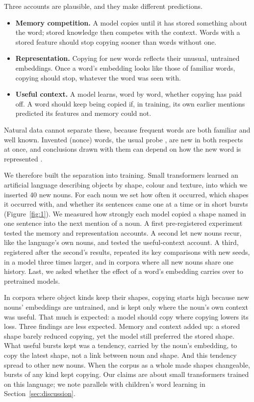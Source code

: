 \documentclass[11pt]{article}
\begin{document}
Three accounts are plausible, and they make different predictions.
\begin{itemize}[leftmargin=*,itemsep=1pt,topsep=2pt]
\item \textbf{Memory competition.} A model copies until it has stored something about the word; stored knowledge then competes with the context. Words with a stored feature should stop copying sooner than words without one.
\item \textbf{Representation.} Copying for new words reflects their unusual, untrained embeddings. Once a word's embedding looks like those of familiar words, copying should stop, whatever the word was seen with.
\item \textbf{Useful context.} A model learns, word by word, whether copying has paid off. A word should keep being copied if, in training, its own earlier mentions predicted its features and memory could not.
\end{itemize}
Natural data cannot separate these, because frequent words are both familiar and well known. Invented (nonce) words, the usual probe \citep{thrush2020,misra2023}, are new in both respects at once, and conclusions drawn with them can depend on how the new word is represented \citep{kim2022lexical,cacioli2026me}.

We therefore built the separation into training. Small transformers learned an artificial language describing objects by shape, colour and texture, into which we inserted 40 new nouns. For each noun we set how often it occurred, which shapes it occurred with, and whether its sentences came one at a time or in short bursts (Figure~\ref{fig:1}). We measured how strongly each model copied a shape named in one sentence into the next mention of a noun. A first pre-registered experiment tested the memory and representation accounts. A second let new nouns recur, like the language's own nouns, and tested the useful-context account. A third, registered after the second's results, repeated its key comparisons with new seeds, in a model three times larger, and in corpora where all new nouns share one history. Last, we asked whether the effect of a word's embedding carries over to pretrained models.

In corpora where object kinds keep their shapes, copying starts high because new nouns' embeddings are untrained, and is kept only where the noun's own context was useful. That much is expected: a model should copy where copying lowers its loss. Three findings are less expected. Memory and context added up: a stored shape barely reduced copying, yet the model still preferred the stored shape. What useful bursts kept was a tendency, carried by the noun's embedding, to copy the latest shape, not a link between noun and shape. And this tendency spread to other new nouns. When the corpus as a whole made shapes changeable, bursts of any kind kept copying. Our claims are about small transformers trained on this language; we note parallels with children's word learning in Section~\ref{sec:discussion}.
\end{document}
